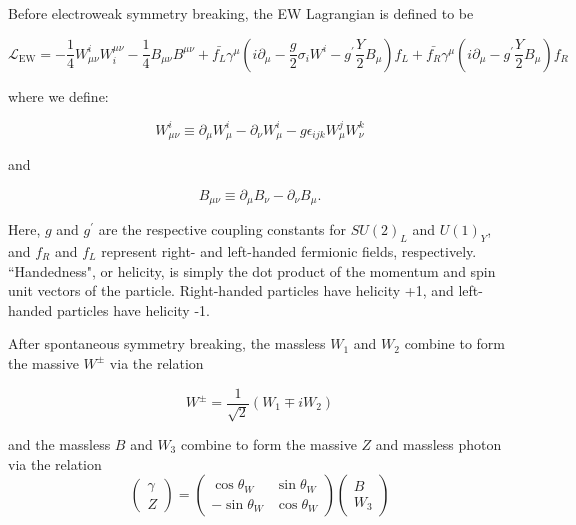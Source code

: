Before electroweak symmetry breaking, the EW Lagrangian is defined to be\cite{srednicki}

\begin{equation}
\mathcal{L}_{\text{EW}} = -\frac{1}{4}W^{i}_{\mu\nu}W^{\mu\nu}_{i} - \frac{1}{4}B_{\mu\nu}B^{\mu\nu} + \bar{f_{L}}\gamma^{\mu}\left(i\partial_{\mu} - \frac{g}{2}\sigma_{i}W^{i} - g^{\prime}\frac{Y}{2}B_{\mu}\right)f_{L} + 
\bar{f_{R}}\gamma^{\mu}\left(i\partial_{\mu} - g^{\prime}\frac{Y}{2}B_{\mu}\right)f_{R}
\end{equation}

\noindent where we define:

\begin{equation}
W^{i}_{\mu\nu} \equiv \partial_{\mu}W^{i}_{\mu} - \partial_{\nu}W^{i}_{\mu} - g\epsilon_{ijk}W^{j}_{\mu}W^{k}_{\nu}
\end{equation}

\noindent and

\begin{equation}
B_{\mu\nu} \equiv \partial_{\mu}B_{\nu} - \partial_{\nu}B_{\mu}.
\end{equation}

Here, $g$ and $g^{\prime}$ are the respective coupling constants for $SU(2)_{L}$ and $U(1)_{Y}$, and $f_{R}$ and $f_{L}$ represent right- and left-handed fermionic fields, respectively. ``Handedness", or helicity, is simply the dot product of the momentum and spin unit vectors of the particle. Right-handed particles have helicity +1, and left-handed particles have helicity -1.

After spontaneous symmetry breaking, the massless $W_{1}$ and $W_{2}$ combine to form the massive $W^{\pm}$ via the relation

\begin{equation}
W^{\pm} = \frac{1}{\sqrt{2}}\left(W_{1} \mp iW_{2}\right)
\end{equation}

\noindent and the massless $B$ and $W_{3}$ combine to form the massive $Z$ and massless photon via the relation
\begin{equation}
\begin{pmatrix}\gamma \\Z\end{pmatrix}=\begin{pmatrix}\cos \theta _{W}&\sin \theta _{W}\\-\sin \theta _{W}&\cos \theta _{W}\end{pmatrix}\begin{pmatrix}B\\W_{3}\end{pmatrix}
\end{equation}

